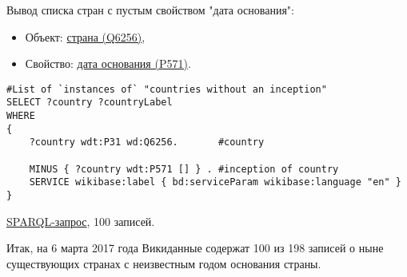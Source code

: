 Вывод списка стран с пустым свойством "дата основания":

\begin{itemize}
    \item Объект: \href{https://www.wikidata.org/wiki/Q6256}{страна (Q6256)},
    \item Свойство: \href{https://www.wikidata.org/wiki/Property:P571}{дата основания (P571)}.
\end{itemize}

\begin{lstlisting}[language=SPARQL]
#List of `instances of` "countries without an inception" 
SELECT ?country ?countryLabel 
WHERE
{
    ?country wdt:P31 wd:Q6256.       #country
    
    MINUS { ?country wdt:P571 [] } . #inception of country
    SERVICE wikibase:label { bd:serviceParam wikibase:language "en" }
}
\end{lstlisting}

\href{https://query.wikidata.org/#%23List%20of%20%60instances%20of%60%20%22countries%20without%20a%20inception%22%20%0ASELECT%20%3Fcountry%20%3FcountryLabel%20%0AWHERE%0A%7B%0A%20%20%20%20%3Fcountry%20wdt%3AP31%20wd%3AQ6256.%20%23country%0A%20%20%20%20%0A%20%20%20%20MINUS%20%7B%20%3Fcountry%20wdt%3AP571%20%5B%5D%20%7D%20.%20%23inception%20of%20country%0A%20%20%20%20SERVICE%20wikibase%3Alabel%20%7B%20bd%3AserviceParam%20wikibase%3Alanguage%20%22en%22%20%7D%0A%7D%0A%0A}{SPARQL-запрос}, 100 записей.

Итак, на 6 марта 2017 года Викиданные содержат 100 из 198 записей о ныне существующих странах с неизвестным годом основания страны.